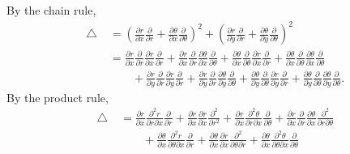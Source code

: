 \documentclass[oneside]{article}
\newcommand*\Laplace{\mathop{}\!\mathbin\bigtriangleup}
\begin{document}
\begin{enumerate}[label=\textbf{\arabic*.}]
By the chain rule,\begin{align*}
  \Laplace
  &= \left(\frac{\partial r}{\partial x}\frac{\partial}{\partial r}
        +\frac{\partial\theta}{\partial x}\frac{\partial}{\partial\theta}
        \right)^2
    + \left(\frac{\partial r}{\partial y}\frac{\partial}{\partial r}
      + \frac{\partial\theta}{\partial y}\frac{\partial}{\partial\theta}
      \right)^2 \\
  &= \frac{\partial r}{\partial x}\frac{\partial}{\partial r}
      \frac{\partial r}{\partial x}\frac{\partial}{\partial r}
      + \frac{\partial r}{\partial x}\frac{\partial}{\partial r}
        \frac{\partial\theta}{\partial x}\frac{\partial}{\partial\theta}
      + \frac{\partial\theta}{\partial x}\frac{\partial}{\partial\theta}
        \frac{\partial r}{\partial x}\frac{\partial}{\partial r}
      + \frac{\partial\theta}{\partial x}\frac{\partial}{\partial\theta}
        \frac{\partial\theta}{\partial x}\frac{\partial}{\partial\theta} \\
  &\qquad+ \frac{\partial r}{\partial y}\frac{\partial}{\partial r}
           \frac{\partial r}{\partial y}\frac{\partial}{\partial r}
      + \frac{\partial r}{\partial y}\frac{\partial}{\partial r}
        \frac{\partial\theta}{\partial y}\frac{\partial}{\partial\theta}
      + \frac{\partial\theta}{\partial y}\frac{\partial}{\partial\theta}
        \frac{\partial r}{\partial y}\frac{\partial}{\partial r}
      + \frac{\partial\theta}{\partial y}\frac{\partial}{\partial\theta}
         \frac{\partial\theta}{\partial y}\frac{\partial}{\partial\theta} \text{.}
\end{align*} By the product rule,\begin{align*}
  \Laplace
  &= \frac{\partial r}{\partial x}
      \frac{\partial^2 r}{\partial r\partial x}\frac{\partial}{\partial r}
      + \frac{\partial r}{\partial x}
      \frac{\partial r}{\partial x}\frac{\partial^2}{\partial r^2}
      + \frac{\partial r}{\partial x}
        \frac{\partial^2 \theta}{\partial r\partial x}
        \frac{\partial}{\partial\theta}
      + \frac{\partial r}{\partial x}\frac{\partial}{\partial r}
        \frac{\partial\theta}{\partial x}\frac{\partial^2}{\partial r\partial\theta} \\
  &\qquad+ \frac{\partial\theta}{\partial x}
        \frac{\partial^2 r}{\partial\theta\partial x}\frac{\partial}{\partial r}
      + \frac{\partial\theta}{\partial x}
        \frac{\partial r}{\partial x}\frac{\partial^2}{\partial\theta\partial r}
      + \frac{\partial\theta}{\partial x}
        \frac{\partial^2 \theta}{\partial\theta\partial x}\frac{\partial}{\partial\theta}

\end{align*}
\end{enumerate}
\end{document}
